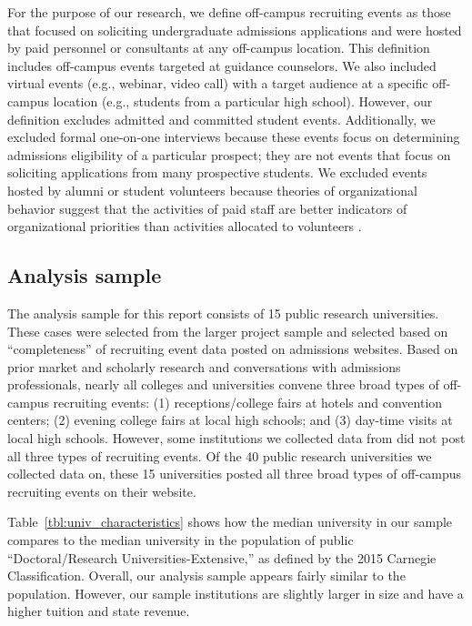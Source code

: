 \documentclass[twoside]{article}
\begin{document}
For the purpose of our research, we define off-campus recruiting events as those that focused on soliciting undergraduate admissions applications and were hosted by paid personnel or consultants at any off-campus location.  This definition includes off-campus events targeted at guidance counselors. We also included virtual events (e.g., webinar, video call) with a target audience at a specific off-campus location (e.g., students from a particular high school).  However, our definition excludes admitted and committed student events. Additionally, we excluded formal one-on-one interviews because these events focus on determining admissions eligibility of a particular prospect; they are not events that focus on soliciting applications from many prospective students. We excluded events hosted by alumni or student volunteers because theories of organizational behavior suggest that the activities of paid staff are better indicators of organizational priorities than activities allocated to volunteers \citep{RN531}.

\subsection*{Analysis sample}

The analysis sample for this report consists of 15 public research universities. These cases were selected from the larger project sample and selected based on ``completeness'' of recruiting event data posted on admissions websites.  Based on prior market and scholarly research  \citep[e.g., ][]{RN3519,RN4324,RN4314,RN4402} and conversations with admissions professionals, nearly all colleges and universities convene three broad types of off-campus recruiting events: (1) receptions/college fairs at hotels and convention centers; (2) evening college fairs at local high schools; and (3) day-time visits at local high schools. However, some institutions we collected data from did not post all three types of recruiting events. Of the 40 public research universities we collected data on, these 15 universities posted all three broad types of off-campus recruiting events on their website.

Table~\ref{tbl:univ_characteristics} shows how the median university in our sample compares to the median university in the population of public ``Doctoral/Research Universities-Extensive,'' as defined by the 2015 Carnegie Classification. Overall, our analysis sample appears fairly similar to the population. However, our sample institutions are slightly larger in size and have a higher tuition and state revenue.
\end{document}
